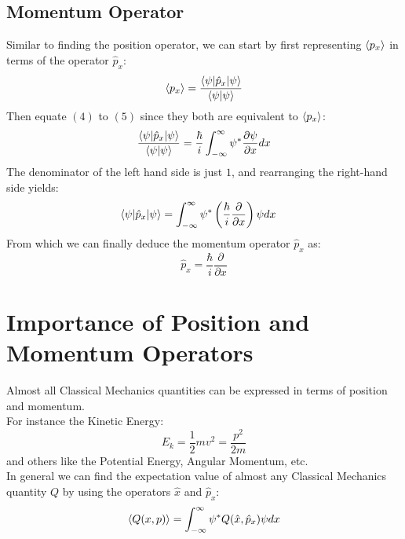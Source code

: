 \documentclass[hidelinks, a4paper, 12pt]{article}
\newcommand{\n}{\\[\baselineskip]}
\newcommand{\xhat}{\hat{x}}
\newcommand{\pxhat}{\hat{p}_x}
\begin{document}
        \subsection{Momentum Operator}
            Similar to finding the position operator, we can start by first representing $\braket{p_x}$ in terms of the operator $\pxhat$:
            \begin{equation}
                \braket{p_x} = \frac{\braket{\psi | \pxhat | \psi}}{\braket{\psi | \psi}}
            \end{equation}
            Then equate $(4)$ to $(5)$ since they both are equivalent to $\braket{p_x}$:
            \[\frac{\braket{\psi | \pxhat | \psi}}{\braket{\psi | \psi}} = \frac{\hbar}{i} \int_{-\infty}^{\infty} \psi^* \frac{\partial \psi}{\partial x} dx\]
            The denominator of the left hand side is just $1$, and rearranging the right-hand side yields:
            \[\begin{split}
                \braket{\psi | \pxhat | \psi} &= \int_{-\infty}^{\infty} \psi^* \left(\frac{\hbar}{i} \frac{\partial}{\partial x}\right)\psi dx
            \end{split}\]
            From which we can finally deduce the momentum operator $\pxhat$ as:
            \[\pxhat = \frac{\hbar}{i} \frac{\partial}{\partial x}\]

    \section{Importance of Position and Momentum Operators}
        Almost all Classical Mechanics quantities can be expressed in terms of position and momentum.\n
        For instance the Kinetic Energy:
        \[E_k = \frac{1}{2}mv^2 = \frac{p^2}{2m}\]
        and others like the Potential Energy, Angular Momentum, etc.\n
        In general we can find the expectation value of almost any Classical Mechanics quantity $Q$ by using the operators $\xhat$ and $\pxhat$:
        \[\braket{Q(x,p)} = \int_{-\infty}^{\infty} \psi^* Q(\xhat, \pxhat) \psi dx\]
    
    
\end{document}
